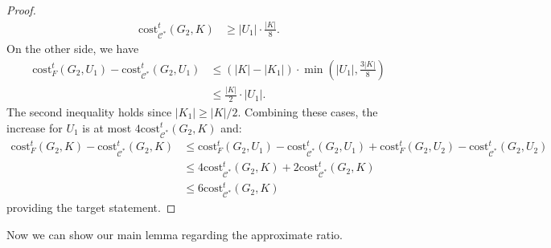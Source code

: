 \documentclass[11pt]{article}
\newcommand{\cost}{\mathrm{cost}}
\begin{document}
\begin{CJK*}{UTF8}{gbsn}
\begin{proof}
\begin{align*}
    \cost^t_{\mathcal{C}^*}(G_2, K) &\geq |U_1| \cdot \frac{|K|}{8}.
\end{align*}
On the other side, we have
\begin{align*}
    \cost^t_{F}(G_2, U_1) - \cost^t_{\mathcal{C}^*}(G_2, U_1) &\leq (|K| - |K_1|) \cdot \min(|U_1|, \frac{3|K|}{8}) \\
    &\leq \frac{|K|}{2} \cdot |U_1|.
\end{align*}
The second inequality holds since $|K_1| \geq |K| / 2$. Combining these cases, the increase for $U_1$ is at most $4\cost^t_{\mathcal{C}^*}(G_2, K)$ and:
\begin{align*}
    \cost^t_{F}(G_2, K) - \cost^t_{\mathcal{C}^*}(G_2, K) &\leq 
    \cost^t_{F}(G_2, U_1) - \cost^t_{\mathcal{C}^*}(G_2, U_1) + \cost^t_{F}(G_2, U_2) - \cost^t_{\mathcal{C}^*}(G_2, U_2) \\
    &\leq 4\cost^t_{\mathcal{C}^*}(G_2, K) + 2\cost^t_{\mathcal{C}^*}(G_2, K) \\
    &\leq 6\cost^t_{\mathcal{C}^*}(G_2, K)
\end{align*}
providing the target statement.
\end{proof}

Now we can show our main lemma regarding the approximate ratio.


\end{CJK*}
\end{document}
